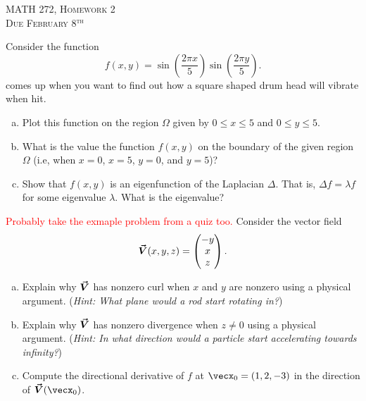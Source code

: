 \documentclass[12pt]{article} %
\begin{document}
\begin{center}
   \textsc{\large MATH 272, Homework 2}\\
   \textsc{Due February 8$^\textrm{th}$}
\end{center}
\vspace{.5cm}





\begin{problem}
Consider the function
\[
f(x,y)=\sin\left(\frac{2\pi x}{5}\right)\sin\left(\frac{2\pi y}{5}\right).
\]
comes up when you want to find out how a square shaped drum head will vibrate when hit.
\begin{enumerate}[(a)]
    \item Plot this function on the region $\Omega$ given by $0\leq x \leq 5$ and $0\leq y \leq 5$.
    \item What is the value the function $f(x,y)$ on the boundary of the given region $\Omega$ (i.e, when $x=0$, $x=5$, $y=0$, and $y=5$)?
    \item Show that $f(x,y)$ is an eigenfunction of the Laplacian $\Delta$. That is, $\Delta f = \lambda f$ for some eigenvalue $\lambda$. What is the eigenvalue?
\end{enumerate}
\end{problem}

\begin{problem}
\textcolor{red}{Probably take the exmaple problem from a quiz too.}
Consider the vector field
\[
\boldsymbol{\vec{V}}(x,y,z) = \begin{pmatrix} -y \\ x \\ z \end{pmatrix}.
\]
\begin{enumerate}[(a)]
    \item Explain why $\boldsymbol{\vec{V}}$ has nonzero curl when $x$ and $y$ are nonzero using a physical argument. (\emph{Hint: What plane would a rod start rotating in?})
    \item Explain why $\boldsymbol{\vec{V}}$ has nonzero divergence when $z\neq 0$ using a physical argument. (\emph{Hint: In what direction would a particle start accelerating towards infinity?})
    \item Compute the directional derivative of $f$ at $\vecx_0 = (1,2,-3)$ in the direction of $\vecfieldV(\vecx_0)$.
\end{enumerate}
\end{problem}
\end{document}
